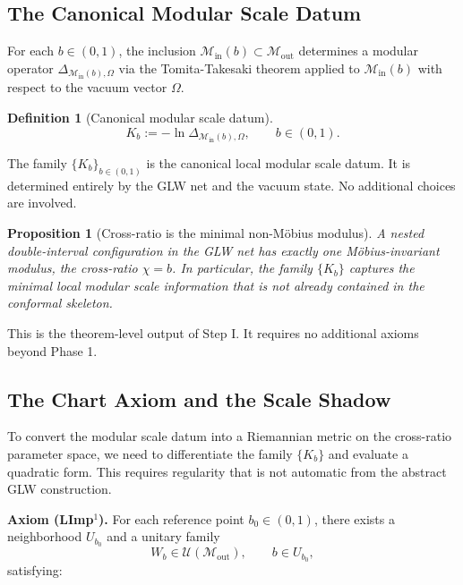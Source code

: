 \documentclass[12pt]{article}
\newtheorem{proposition}[theorem]{Proposition}
\theoremstyle{definition}
\newtheorem{definition}[theorem]{Definition}
\theoremstyle{remark}
\begin{document}
\subsection{The Canonical Modular Scale
Datum}\label{the-canonical-modular-scale-datum}

For each \(b \in (0,1)\), the inclusion
\(\mathcal{M}_{\mathrm{in}}(b) \subset \mathcal{M}_{\mathrm{out}}\)
determines a modular operator
\(\Delta_{\mathcal{M}_{\mathrm{in}}(b),\Omega}\) via the Tomita-Takesaki
theorem applied to \(\mathcal{M}_{\mathrm{in}}(b)\) with respect to the
vacuum vector \(\Omega\).

\begin{definition}[Canonical modular scale datum]\label{def:5.1}
\[
K_b := -\ln \Delta_{\mathcal{M}_{\mathrm{in}}(b),\Omega},
\qquad b \in (0,1).
\]
\end{definition}

The family \(\{K_b\}_{b \in (0,1)}\) is the canonical local modular
scale datum. It is determined entirely by the GLW net and the vacuum
state. No additional choices are involved.

\begin{proposition}[Cross-ratio is the minimal non-M\"obius
modulus]\label{prop:5.2}
A nested double-interval configuration in the GLW net has
exactly one Möbius-invariant modulus, the cross-ratio \(\chi = b\). In
particular, the family \(\{K_b\}\) captures the minimal local modular
scale information that is not already contained in the conformal
skeleton.
\end{proposition}

This is the theorem-level output of Step I. It requires no additional
axioms beyond Phase 1.

\subsection{The Chart Axiom and the Scale
Shadow}\label{the-chart-axiom-and-the-scale-shadow}

To convert the modular scale datum into a Riemannian metric on the
cross-ratio parameter space, we need to differentiate the family
\(\{K_b\}\) and evaluate a quadratic form. This requires regularity that
is not automatic from the abstract GLW construction.

\textbf{Axiom (LImp\(^1\)).} For each reference point \(b_0 \in (0,1)\),
there exists a neighborhood \(U_{b_0}\) and a unitary family \[
W_b \in \mathcal{U}(\mathcal{M}_{\mathrm{out}}),
\qquad b \in U_{b_0},
\] satisfying:
\end{document}
